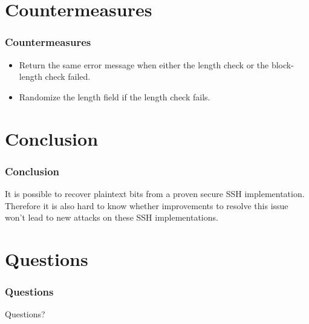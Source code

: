 \documentclass[fleqn]{beamer}
\begin{document}
\section{Countermeasures}

   \begin{frame}
    \frametitle{Countermeasures}
        \begin{itemize}
      \item Return the same error message when either the length check or the block-length check failed.
      \item Randomize the length field if the length check fails.
    \end{itemize}   
  \end{frame}	

\section{Conclusion}

   \begin{frame}
    \frametitle{Conclusion}
     It is possible to recover plaintext bits from a proven secure SSH implementation. Therefore it is also hard to know whether improvements to resolve this issue won't lead to new attacks on these SSH implementations.
  \end{frame}	

\section{Questions}

  \begin{frame}
    \frametitle{Questions}
    \begin{center}
    Questions?
    \end{center}
  \end{frame}
\end{document}
